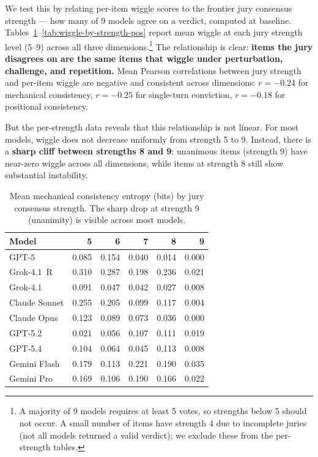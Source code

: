 We test this by relating per-item wiggle scores to the frontier jury consensus strength --- how many of 9 models agree on a verdict, computed at baseline. Tables~\ref{tab:wiggle-by-strength-mc}--\ref{tab:wiggle-by-strength-pos} report mean wiggle at each jury strength level (5--9) across all three dimensions.\footnote{A majority of 9 models requires at least 5 votes, so strengths below 5 should not occur. A small number of items have strength 4 due to incomplete juries (not all models returned a valid verdict); we exclude these from the per-strength tables.} The relationship is clear: \textbf{items the jury disagrees on are the same items that wiggle under perturbation, challenge, and repetition.} Mean Pearson correlations between jury strength and per-item wiggle are negative and consistent across dimensions: $r = -0.24$ for mechanical consistency, $r = -0.25$ for single-turn conviction, $r = -0.18$ for positional consistency.

But the per-strength data reveals that this relationship is not linear. For most models, wiggle does not decrease uniformly from strength 5 to 9. Instead, there is a \textbf{sharp cliff between strengths 8 and 9}: unanimous items (strength 9) have near-zero wiggle across all dimensions, while items at strength 8 still show substantial instability.

\begin{table}[t]
\centering
\caption{Mean mechanical consistency entropy (bits) by jury consensus strength. The sharp drop at strength 9 (unanimity) is visible across most models.}
\label{tab:wiggle-by-strength-mc}
\begin{tabular}{@{}lrrrrr@{}}
\toprule
\textbf{Model} & \textbf{5} & \textbf{6} & \textbf{7} & \textbf{8} & \textbf{9} \\
\midrule
GPT-5         & 0.085 & 0.154 & 0.040 & 0.014 & 0.000 \\
Grok-4.1~R    & 0.310 & 0.287 & 0.198 & 0.236 & 0.021 \\
Grok-4.1      & 0.091 & 0.047 & 0.042 & 0.027 & 0.008 \\
Claude Sonnet & 0.255 & 0.205 & 0.099 & 0.117 & 0.004 \\
Claude Opus   & 0.123 & 0.089 & 0.073 & 0.036 & 0.000 \\
GPT-5.2       & 0.021 & 0.056 & 0.107 & 0.111 & 0.019 \\
GPT-5.4       & 0.104 & 0.064 & 0.045 & 0.113 & 0.008 \\
Gemini Flash  & 0.179 & 0.113 & 0.221 & 0.190 & 0.035 \\
Gemini Pro    & 0.169 & 0.106 & 0.190 & 0.166 & 0.022 \\
\bottomrule
\end{tabular}
\end{table}

